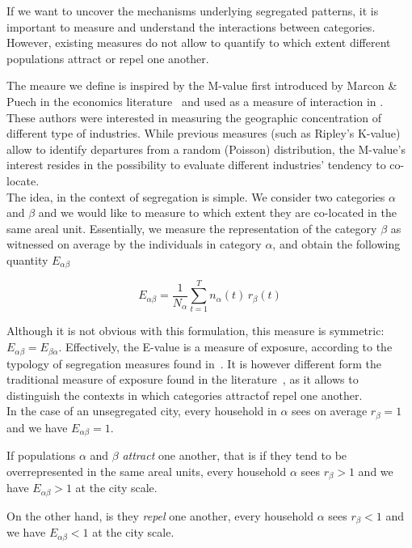 If we want to uncover the mechanisms underlying segregated patterns, it is
important to measure and understand the interactions between categories.
However, existing measures do not allow to quantify to which extent different populations
attract or repel one another. 

The meaure we define is inspired by the M-value first introduced by Marcon \&
Puech in the economics literature~\cite{Marcon:2009} and used as a measure of
interaction in \cite{Jensen:2006}.  These authors were interested in measuring
the geographic concentration of different type of  industries. While previous
measures (such as Ripley's K-value) allow to identify departures from a random
(Poisson) distribution, the M-value's interest resides in the possibility to
evaluate different industries' tendency to co-locate.\\

The idea, in the context of segregation is simple. We consider two categories
$\alpha$ and $\beta$ and we would like to measure to which extent they are
co-located in the same areal unit. Essentially, we measure the representation of
the category $\beta$ as witnessed on average by the individuals in category
$\alpha$, and obtain the following quantity $E_{\alpha\beta}$

\begin{equation} 
    E_{\alpha \beta} = \frac{1}{N_\alpha} \sum_{t=1}^{T} n_\alpha(t)\,r_\beta(t) 
\end{equation}

Although it is not obvious with this formulation, this measure is symmetric:
$E_{\alpha \beta} = E_{\beta \alpha}$. Effectively, the E-value is a measure of exposure,
according to the typology of segregation measures found in~\cite{Massey:1988}.
It is however different form the traditional measure of exposure found in the
literature~\cite{Bell:1954}, as it allows to distinguish the contexts in
which categories attractof repel one another.\\

In the case of an unsegregated city, every household in $\alpha$ sees
on average $r_\beta = 1$ and we have $E_{\alpha \beta} = 1$. 

If populations $\alpha$ and $\beta$ {\em attract} one another, that is if they
tend to be overrepresented in the same areal units, every household $\alpha$
sees $r_\beta > 1$ and we have $E_{\alpha \beta} > 1$ at the city scale. 

On the other hand, is they
{\em repel} one another, every household $\alpha$ sees $r_\beta < 1$
and we have $E_{\alpha \beta} <1$ at the city scale. 



